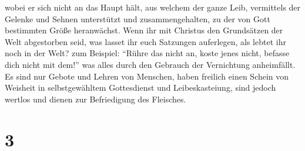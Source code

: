  wobei er sich nicht an das Haupt hält, aus welchem der
ganze Leib, vermittels der Gelenke und Sehnen unterstützt und
zusammengehalten, zu der von Gott bestimmten Größe heranwächst.
 Wenn ihr mit Christus den Grundsätzen der Welt
abgestorben seid, was lasset ihr euch Satzungen auferlegen, als lebtet
ihr noch in der Welt?  zum Beispiel: ``Rühre das nicht
an, koste jenes nicht, befasse dich nicht mit dem!''  was
alles durch den Gebrauch der Vernichtung anheimfällt.  Es
sind nur Gebote und Lehren von Menschen, haben freilich einen Schein von
Weisheit in selbstgewähltem Gottesdienst und Leibeskasteiung, sind
jedoch wertlos und dienen zur Befriedigung des Fleisches.

\hypertarget{section-2}{%
\section{3}\label{section-2}}

